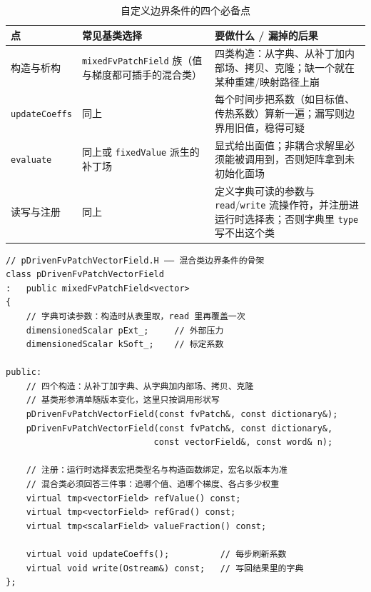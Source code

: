 \documentclass[12pt,a4paper,fontset=fandol]{ctexbook}
\newcommand{\Tp}[1]{\texttt{#1}}
\newcommand{\Bk}{\discretionary{}{}{}}
\begin{document}
\begin{table}[htbp]
\centering
\caption{自定义边界条件的四个必备点}
\label{tab:ch06-bc-four}
\begin{tabular}{>{\raggedright\arraybackslash}p{}>{\raggedright\arraybackslash}p{}>{\raggedright\arraybackslash}p{}}
\toprule
点 & 常见基类选择 & 要做什么 / 漏掉的后果 \\
\midrule
构造与析构 & \Tp{mixedFvPatchField} 族（值与梯度都可插手的混合类） & 四类构造：从字典、从补丁加内部场、拷贝、克隆；缺一个就在某种重建/映射路径上崩 \\
\Tp{updateCoeffs} & 同上 & 每个时间步把系数（如目标值、传热系数）算新一遍；漏写则边界用旧值，稳得可疑 \\
\Tp{evaluate} & 同上或 \Tp{fixedValue} 派生的补丁场 & 显式给出面值；非耦合求解里必须能被调用到，否则矩阵拿到未初始化面场 \\
读写与注册 & 同上 & 定义字典可读的参数与 \Tp{read}/{\Bk}\Tp{write} 流操作符，并注册进运行时选择表；否则字典里 \Tp{type} 写不出这个类 \\
\bottomrule
\end{tabular}
\end{table}

\begin{lstlisting}[style=cppstyle, caption={一个混合类边界条件：外壳与
\Tp{updateCoeffs} 的核心（注册宏名以版本为准）}, label={lst:ch06-bc-code}]
// pDrivenFvPatchVectorField.H —— 混合类边界条件的骨架
class pDrivenFvPatchVectorField
:   public mixedFvPatchField<vector>
{
    // 字典可读参数：构造时从表里取，read 里再覆盖一次
    dimensionedScalar pExt_;     // 外部压力
    dimensionedScalar kSoft_;    // 标定系数

public:
    // 四个构造：从补丁加字典、从字典加内部场、拷贝、克隆
    // 基类形参清单随版本变化，这里只按调用形状写
    pDrivenFvPatchVectorField(const fvPatch&, const dictionary&);
    pDrivenFvPatchVectorField(const fvPatch&, const dictionary&,
                             const vectorField&, const word& n);

    // 注册：运行时选择表宏把类型名与构造函数绑定，宏名以版本为准
    // 混合类必须回答三件事：追哪个值、追哪个梯度、各占多少权重
    virtual tmp<vectorField> refValue() const;
    virtual tmp<vectorField> refGrad() const;
    virtual tmp<scalarField> valueFraction() const;

    virtual void updateCoeffs();          // 每步刷新系数
    virtual void write(Ostream&) const;   // 写回结果里的字典
};
\end{lstlisting}
\end{document}
